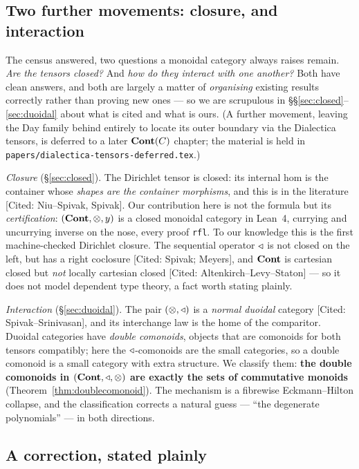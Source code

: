 \subsection*{Two further movements: closure, and interaction}

The census answered, two questions a monoidal category always raises remain.
\emph{Are the tensors closed?} And \emph{how do they interact with one another?}
Both have clean answers, and both are largely a matter of \emph{organising}
existing results correctly rather than proving new ones --- so we are scrupulous
in §§\ref{sec:closed}--\ref{sec:duoidal} about what is cited and what is ours.
(A further movement, leaving the Day family behind entirely to locate its outer
boundary via the Dialectica tensors, is deferred to a later $\mathbf{Cont}(C)$ chapter;
the material is held in \texttt{papers/dialectica-tensors-deferred.tex}.)

\emph{Closure} (§\ref{sec:closed}). The Dirichlet tensor is closed: its internal
hom is the container whose \emph{shapes are the container morphisms}, and this is
in the literature [Cited: Niu--Spivak, Spivak]. Our contribution here is not the
formula but its \emph{certification}: $(\mathbf{Cont},\mathbin{\otimes},y)$ is a closed monoidal
category in Lean~4, currying and uncurrying inverse on the nose, every proof
\texttt{rfl}. To our knowledge this is the first machine-checked Dirichlet
closure. The sequential operator $\mathbin{\triangleleft}$ is not closed on the left, but has a
right coclosure [Cited: Spivak; Meyers], and $\mathbf{Cont}$ is cartesian closed but
\emph{not} locally cartesian closed [Cited: Altenkirch--Levy--Staton] --- so it
does not model dependent type theory, a fact worth stating plainly.

\emph{Interaction} (§\ref{sec:duoidal}). The pair $(\mathbin{\otimes},\mathbin{\triangleleft})$ is a
\emph{normal duoidal} category [Cited: Spivak--Srinivasan], and its interchange
law is the home of the comparitor. Duoidal categories have \emph{double
comonoids}, objects that are comonoids for both tensors compatibly; here the
$\mathbin{\triangleleft}$-comonoids are the small categories, so a double comonoid is a small
category with extra structure. We classify them: \textbf{the double comonoids in
$(\mathbf{Cont},\mathbin{\triangleleft},\mathbin{\otimes})$ are exactly the sets of commutative monoids}
(Theorem~\ref{thm:doublecomonoid}). The mechanism is a fibrewise
Eckmann--Hilton collapse, and the classification corrects a natural guess ---
``the degenerate polynomials'' --- in both directions.

\subsection*{A correction, stated plainly}
\label{sec:erratum}

